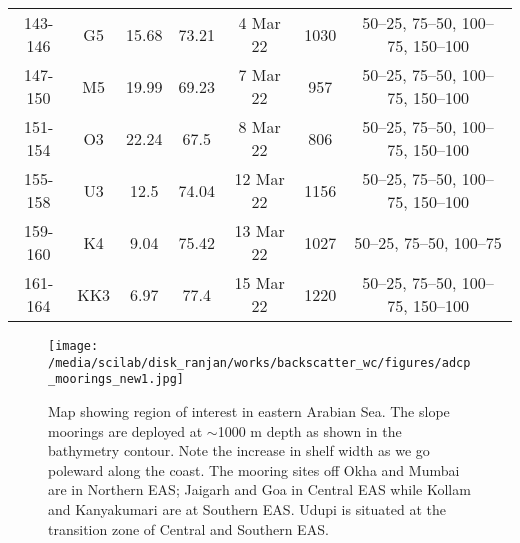 \documentclass{article}
\begin{document}
\begin{table}[htbp]
{\begin{adjustwidth}{0in}{0in}
\begin{tabular}{ccccccc}
				143-146       & G5  & 15.68      & 73.21      & 4 Mar 22                  & 1030       & 50–25, 75–50, 100–75, 150–100 \\
				147-150       & M5  & 19.99      & 69.23      & 7 Mar 22                  & 957        & 50–25, 75–50, 100–75, 150–100 \\
				151-154       & O3  & 22.24      & 67.5       & 8 Mar 22                  & 806        & 50–25, 75–50, 100–75, 150–100 \\
				155-158       & U3  & 12.5       & 74.04      & 12 Mar 22                 & 1156       & 50–25, 75–50, 100–75, 150–100 \\
				159-160       & K4  & 9.04       & 75.42      & 13 Mar 22                 & 1027       & 50–25, 75–50, 100–75          \\
				161-164       & KK3 & 6.97       & 77.4       & 15 Mar 22                 & 1220       & 50–25, 75–50, 100–75, 150–100
				\\ 
				\bottomrule
			\end{tabular}
		\end{adjustwidth}
		\label{tab:table2}
	}
\end{table}


\newpage
\begin{figure}[htbp]
	\centering
	\texttt{[image: /media/scilab/disk\_ranjan/works/backscatter\_wc/figures/adcp\_moorings\_new1.jpg]} 
	\captionsetup{justification=justified,font=footnotesize,skip=0.05\baselineskip,width=0.8\textwidth}
	\caption{Map showing region of interest in eastern Arabian Sea. The slope moorings are
		deployed at $\sim$1000 m depth as shown in the bathymetry contour. Note the increase in shelf width as we go poleward along the coast. The mooring sites off Okha and Mumbai are in Northern EAS; Jaigarh and Goa in Central EAS while Kollam and Kanyakumari are at Southern EAS. Udupi is situated at the transition zone of Central and Southern EAS.}
	\label{fig:map}
\end{figure}
\end{document}
